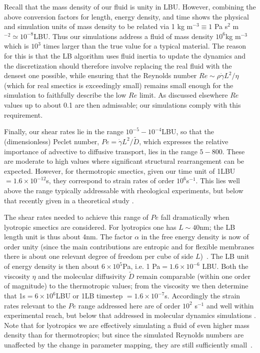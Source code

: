 \documentclass[8.5pt,twoside,twocolumn]{article}
\begin{document}
Recall that the mass density of our fluid is unity in LBU. However, combining the above conversion factors for length,  energy density, and time shows the physical and simulation units of mass density to be related via 1 kg m$^{-3} \equiv 1$ Pa s$^2$ m$^{-2} \simeq 10^{-8}$LBU. Thus our simulations address a fluid of mass density $10^6$kg m$^{-3}$ which is $10^3$ times larger than the true value for a typical material. The reason for this is that the LB algorithm uses fluid inertia to update the dynamics and the discretization should therefore involve replacing the real fluid with the densest one possible, while ensuring that the Reynolds number $Re \sim \rho\dot\gamma L^2/\eta$ (which for real smectics is exceedingly small) remains small enough for the simulation to faithfully describe the low $Re$ limit. As discussed elsewhere \cite{Cates04, Cates09} $Re$ values up to about 0.1 are then admissable; our simulations comply with this requirement. 

Finally, our shear rates lie in the range 
$10^{-5}-10^{-4}$LBU, so that the (dimensionless) Peclet number, $Pe =\dot\gamma L^2/\tilde D$, which expresses the relative importance of advective to diffusive transport, lies in the range $5-800$. These are moderate to high values where significant structural rearrangement can be expected. However, for thermotropic smectics, given our time unit of 1LBU$=1.6\times 10^{-12}$s, they correspond to strain rates of order $10^6$s$^{-1}$. This lies well above the range typically addressable with rheological experiments, but below that recently given in a theoretical study \cite{Stewart2009}.

The shear rates needed to achieve this range of $Pe$ fall dramatically when lyotropic smectics are considered. For lyotropics one has $L\sim 40$nm; the LB length unit is thus about 4nm. The factor $\alpha$ in the free energy density is now of order unity (since the main contributions are entropic and for flexible membranes there is about one relevant degree of freedom per cube of side $L$)~\cite{Safran}. The LB unit of energy density is then about $6\times 10^{5}$Pa, i.e. 1 Pa$= 1.6 \times 10^{-6}$ LBU. Both the viscosity $\eta$ and the molecular diffusivity $\tilde D$ remain comparable (within one order of magnitude) to the thermotropic values; from the viscosity we then determine that 1s$=6\times 10^6$LBU or 1LB timestep $=1.6\times 10^{-7}$s. Accordingly the strain rates relevant to the $Pe$ range addressed here are of order $10^2$ s$^{-1}$ and well within experimental reach, but below that addressed in molecular dynamics simulations \cite{Guo2002,Soddemann2004}. Note that for lyotropics we are effectively simulating a fluid of even higher mass density than for thermotropics; but since the simulated Reynolds numbers are unaffected by the change in parameter mapping, they are still sufficiently small~\cite{Cates04}. 
\end{document}

